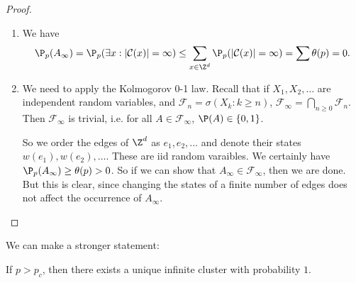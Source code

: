 \documentclass[a4paper]{article}
\begin{document}
\begin{proof}\leavevmode
  \begin{enumerate}
    \item We have
      \[
        \P_p(A_\infty) = \P_p(\exists x: |\mathcal{C}(x)| = \infty) \leq \sum_{x \in \Z^d} \P_p(|\mathcal{C}(x)| = \infty) = \sum \theta(p) = 0.
      \]
    \item We need to apply the Kolmogorov 0-1 law. Recall that if $X_1, X_2, \ldots$ are independent random variables, and $\mathcal{F}_n = \sigma(X_k: k \geq n)$, $\mathcal{F}_\infty = \bigcap_{n \geq 0} \mathcal{F}_n$. Then $\mathcal{F}_\infty$ is trivial, i.e. for all $A \in \mathcal{F}_\infty$, $\P(A) \in \{0, 1\}$.

      So we order the edges of $\Z^d$ as $e_1, e_2, \ldots$ and denote their states $w(e_1), w(e_2), \ldots$. These are iid random varaibles. We certainly have $\P_p(A_\infty) \geq \theta(p) > 0$. So if we can show that $A_\infty \in \mathcal{F}_\infty$, then we are done. But this is clear, since changing the states of a finite number of edges does not affect the occurrence of $A_\infty$.
  \end{enumerate}
\end{proof}

We can make a stronger statement:
\begin{thm} %
  If $p > p_c$, then there exists a unique infinite cluster with probability $1$.
\end{thm}
\end{document}
